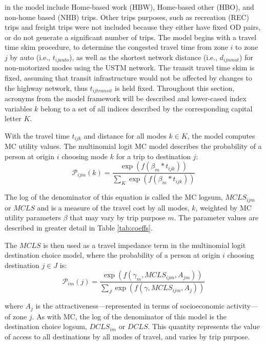 in the model include Home-based work (HBW), Home-based other (HBO),
and non-home based (NHB) trips. Other trips purposes, such as recreation (REC) trips and freight trips were not included because they either have fixed OD pairs, or do not generate a significant number of trips.
The model begins with a
travel time skim procedure, to determine the congested travel time from zone
\(i\) to zone \(j\) by auto (i.e., \(t_{ijauto}\)), as well as the shortest network distance (i.e., \(d_{ijnmot}\)) for non-motorized modes using the USTM network. The transit travel time skim is fixed, assuming that transit
infrastructure would not be affected by changes to the highway network, thus \(t_{ijtransit}\) is held fixed.
Throughout this section, acronyms from the model framework will be described and lower-cased index variables \(k\) belong to a set of
all indices described by the corresponding capital letter \(K\).

With the travel time \(t_{ijk}\) and distance for all modes \(k \in K\), the
model computes MC utility values. The multinomial logit MC
model describes the probability of a person at origin \(i\) choosing mode \(k\)
for a trip to destination \(j\):
\begin{equation}
\mathcal{P}_{ijm}(k) = \frac{\exp(f(\beta_m * t_{ijk}))}
{\sum_{K}\exp(f(\beta_m * t_{ijk}))}
  \label{eq:mcp}
\end{equation}

\noindent The log of the denominator of this equation is called the
MC logsum, \(MCLS_{ijm}\) or \(MCLS\) and is a measure of the travel cost by
all modes, $k$, weighted by MC utility parameters \(\beta\) that may vary by
trip purpose $m$. The parameter values are described in greater detail in
Table \ref{tab:coeffs}.

The \(MCLS\) is then used as a travel impedance term in the multinomial
logit
destination choice model, where the probability of a person at origin \(i\)
choosing destination \(j \in J\) is:
\begin{equation}
\mathcal{P}_{im}(j) = \frac{\exp(f(\gamma_m, MCLS_{ijm}, A_{jm}))}
{\sum_{J}\exp(f(\gamma, MCLS_{ijm}, A_j))}
  \label{eq:dcp}
\end{equation}

\noindent where \(A_j\) is the attractiveness---represented in terms of
socioeconomic activity---of zone \(j\). As with MC, the log of the
denominator of this model is the
destination choice logsum, \(DCLS_{im}\) or \(DCLS\). This quantity represents the value of access to
all destinations
by all modes of travel, and varies by trip purpose.

